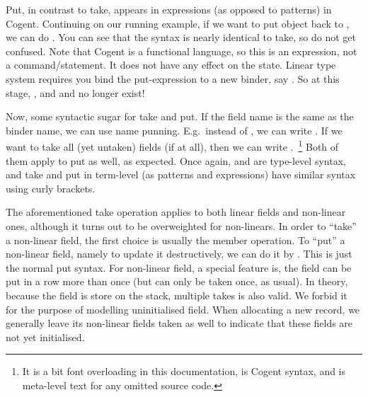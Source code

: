 \documentclass[a4paper]{article}
\newcommand{\cogent}{Cogent\xspace}
\begin{document}
Put, in contrast to take, appears in expressions (as opposed to patterns) in \cogent. Continuing on our running example, if we want to put object  back to
, we can do . You can see that the syntax is nearly identical to take, so do not get confused.
Note that \cogent is a functional language, so this is an expression, not a command/statement. It does not have any effect on the state.
Linear type system requires you bind the put-expression to a new binder, say .
So at this stage, , and  and  no longer exist!

Now, some syntactic sugar for take and put. If the field name is the same as the binder name, we can use name punning. E.g.\ instead of
, we can write . If we want to take all (yet untaken) fields (if at all), then we can write
.~\footnote{It is a bit font overloading in this documentation,
 is \cogent syntax, and  is meta-level text for any omitted source code.}
Both of them apply to put as well, as expected. Once again,  and  are type-level
syntax, and take and put in term-level (as patterns and expressions) have similar syntax using curly brackets.

The aforementioned take operation applies to both linear fields and non-linear ones, although it turns out to be overweighted for non-linears. In order to ``take'' a non-linear field, the first
choice is usually the member operation. To ``put'' a non-linear field, namely to update it
destructively, we can do it by . This is just the normal
put syntax. For non-linear field, a special feature is, the field can be put
in a row more than once (but can only be taken once, as usual). In theory, because the field
is store on the stack, multiple takes is also valid. We forbid it for the purpose of modelling
uninitialised field. When allocating a new record, we generally leave its non-linear fields
taken as well to indicate that these fields are not yet initialised.
\end{document}
